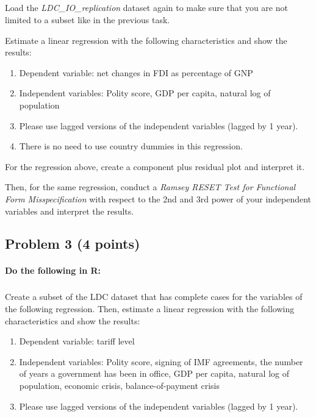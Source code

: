 \documentclass[12pt]{article}
\begin{document}
\subparagraph{} Load the \textit{LDC\_IO\_replication} dataset again to make sure that you are not limited to a subset like in the previous task.

\bigskip

Estimate a linear regression with the following characteristics and show the results:

\begin{enumerate}
	\item Dependent variable: net changes in FDI as percentage of GNP
	\item Independent variables: Polity score, GDP per capita, natural log of population
	\item Please use lagged versions of the independent variables (lagged by 1 year).
	\item There is no need to use country dummies in this regression.
\end{enumerate}

\bigskip

For the regression above, create a component plus residual plot and interpret it.

\bigskip

Then, for the same regression,  conduct a \textit{Ramsey RESET Test for Functional Form Misspecification} with respect to the 2nd and 3rd power of your independent variables and interpret the results.



\subsection*{Problem 3 (4 points)}

\paragraph{Do the following in R:}

\subparagraph{} Create a subset of the LDC dataset that has complete cases for the variables of the following regression. Then, estimate a linear regression with the following characteristics and show the results:

\begin{enumerate}
	\item Dependent variable: tariff level
	\item Independent variables: Polity score, signing of IMF agreements, the number of years a government has been in office, GDP per capita, natural log of population, economic crisis, balance-of-payment crisis
	\item Please use lagged versions of the independent variables (lagged by 1 year).
\end{enumerate}
\end{document}
